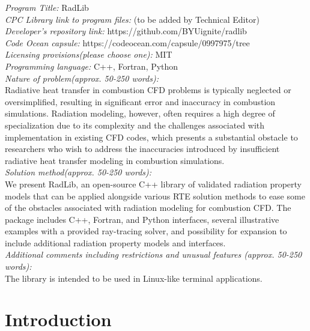 \documentclass[preprint,12pt]{elsarticle}
\begin{document}
\begin{small}
\noindent
{\em Program Title:} RadLib                                         \\
{\em CPC Library link to program files:} (to be added by Technical Editor) \\
{\em Developer's repository link:} https://github.com/BYUignite/radlib \\
{\em Code Ocean capsule:} https://codeocean.com/capsule/0997975/tree \\
{\em Licensing provisions(please choose one):} MIT \\
{\em Programming language:} C++, Fortran, Python \\
{\em Nature of problem(approx. 50-250 words):} \\
Radiative heat transfer in combustion CFD problems is typically neglected or oversimplified, resulting in significant error and inaccuracy in combustion simulations. Radiation modeling, however, often requires a high degree of specialization due to its complexity and the challenges associated with implementation in existing CFD codes, which presents a substantial obstacle to researchers who wish to address the inaccuracies introduced by insufficient radiative heat transfer modeling in combustion simulations. \\
{\em Solution method(approx. 50-250 words):}\\
We present RadLib, an open-source C++ library of validated radiation property models that can be applied alongside various RTE solution methods to ease some of the obstacles associated with radiation modeling for combustion CFD. The package includes C++, Fortran, and Python interfaces, several illustrative examples with a provided ray-tracing solver, and possibility for expansion to include additional radiation property models and interfaces.\\ 
{\em Additional comments including restrictions and unusual features (approx. 50-250 words):}\\
The library is intended to be used in Linux-like terminal applications.  
   \\

\end{small}


\section{Introduction} \label{s:intro}
\end{document}
